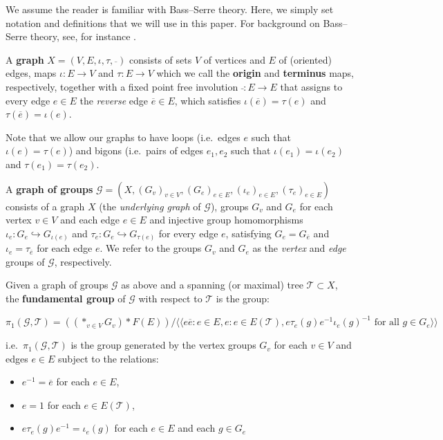 \documentclass{amsart}
\theoremstyle{plain}
\theoremstyle{definition}
\theoremstyle{remark}
\begin{document}
We assume the reader is familiar with Bass--Serre theory. Here, we simply set notation and definitions that we will use in this paper. For background on Bass--Serre theory, see, for instance \cite{Trees}. 

A \textbf{graph} $X = (V, E, \iota, \tau, \overline{})$ consists of sets $V$ of vertices and $E$ of (oriented) edges, maps $\iota : E \to V$ and $\tau : E \to V$ which we call the \textbf{origin} and \textbf{terminus} maps, respectively, together with a fixed point free involution $\bar{} : E \to E$ that assigns to every edge $e \in E$ the \emph{reverse} edge $\overline{e} \in E$, which satisfies $\iota(\overline{e}) = \tau(e)$ and $\tau(\overline{e}) = \iota(e)$. 

Note that we allow our graphs to have loops (i.e.\ edges $e$ such that $\iota(e) = \tau(e)$) and bigons (i.e.\ pairs of edges $e_1, e_2$ such that $\iota(e_1) = \iota(e_2)$ and $\tau(e_1) = \tau(e_2)$. 

A \textbf{graph of groups} $\mathcal{G} = (X, (G_v)_{v \in V}, (G_e)_{e \in E}, (\iota_e)_{e \in E}, (\tau_e)_{e \in E})$ consists of a graph $X$ (the \emph{underlying graph} of $\mathcal{G}$), groups $G_v$ and $G_e$ for each vertex $v \in V$ and each edge $e \in E$ and injective group homomorphisms $\iota_e : G_e \hookrightarrow G_{\iota(e)}$ and $\tau_e : G_e \hookrightarrow G_{\tau(e)}$ for every edge $e$, satisfying $G_e = G_{\overline{e}}$ and $\iota_e = \tau_{\overline{e}}$ for each edge $e$. We refer to the groups $G_v$ and $G_e$ as the \emph{vertex} and \emph{edge} groups of $\mathcal{G}$, respectively. 

Given a graph of groups $\mathcal{G}$ as above and a spanning (or maximal) tree $\mathcal{T} \subset X$, the \textbf{fundamental group} of $\mathcal{G}$ with respect to $\mathcal{T}$ is the group: 

$$\pi_1(\mathcal{G}, \mathcal{T}) = ((*_{v \in V} G_v) * F(E)) / \langle \langle e\overline{e}: e \in E, e : e \in E(\mathcal{T}), e \tau_e(g) e^{-1}\iota_e(g)^{-1} \text{ for all $g \in G_e$} \rangle \rangle $$

i.e.\ $\pi_1(\mathcal{G}, \mathcal{T})$ is the group generated by the vertex groups $G_v$ for each $v \in V$ and edges $e \in E$ subject to the relations: 

\begin{itemize}
    \item $e^{-1} = \overline{e}$ for each $e \in E$,
    \item $e = 1$ for each $e \in E(\mathcal{T})$,
    \item $e \tau_e(g) e^{-1} = \iota_e(g)$ for each $e \in E$ and each $g \in G_e$
\end{itemize}
\end{document}
